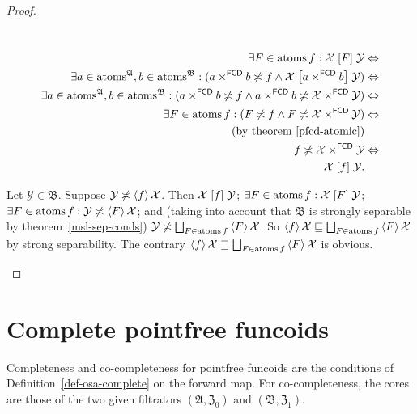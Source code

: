 \begin{proof}
~
\begin{widedisorder}
\item [{\ref{pf-r-at}}] ~
\begin{align*}
\exists F\in\operatorname{atoms} f:\mathcal{X}\mathrel{\left[F\right]}\mathcal{Y} & \Leftrightarrow\\
\exists a\in\operatorname{atoms}^{\mathfrak{A}},b\in\operatorname{atoms}^{\mathfrak{B}}:(a\times^{\mathsf{FCD}}b\not\asymp f\land\mathcal{X}\mathrel{\left[a\times^{\mathsf{FCD}}b\right]}\mathcal{Y}) & \Leftrightarrow\\
\exists a\in\operatorname{atoms}^{\mathfrak{A}},b\in\operatorname{atoms}^{\mathfrak{B}}:(a\times^{\mathsf{FCD}}b\not\asymp f\land a\times^{\mathsf{FCD}}b\not\asymp\mathcal{X}\times^{\mathsf{FCD}}\mathcal{Y}) & \Leftrightarrow\\
\exists F\in\operatorname{atoms} f:(F\not\asymp f\land F\not\asymp\mathcal{X}\times^{\mathsf{FCD}}\mathcal{Y}) & \Leftrightarrow\\
\text{(by theorem~\ref{pfcd-atomic})}\\
f\not\asymp\mathcal{X}\times^{\mathsf{FCD}}\mathcal{Y} & \Leftrightarrow\\
\mathcal{X}\mathrel{\left[f\right]}\mathcal{Y}.
\end{align*}

\item [{\ref{pf-f-at}}] Let $\mathcal{Y}\in\mathfrak{B}$. Suppose
$\mathcal{Y}\not\asymp\left\langle f\right\rangle\mathcal{X}$. Then $\mathcal{X}\mathrel{\left[f\right]}\mathcal{Y}$;
$\exists F\in\operatorname{atoms} f:\mathcal{X}\mathrel{\left[F\right]}\mathcal{Y}$; $\exists F\in\operatorname{atoms} f:\mathcal{Y}\not\asymp\left\langle F\right\rangle\mathcal{X}$;
and (taking into account that $\mathfrak{B}$ is strongly separable by theorem~\ref{msl-sep-conds})
$\mathcal{Y}\nasymp\bigsqcup_{F\in\atoms f}\supfun F\mathcal{X}$.
So $\supfun f\mathcal{X}\sqsubseteq\bigsqcup_{F\in\atoms f}\supfun F\mathcal{X}$ by strong separability.
The contrary $\supfun f\mathcal{X}\sqsupseteq\bigsqcup_{F\in\atoms f}\supfun F\mathcal{X}$
is obvious.
\end{widedisorder}
\end{proof}

\section{Complete pointfree funcoids}
Completeness and co-completeness for pointfree funcoids are the
conditions of Definition~\ref{def-osa-complete} on the forward map.
For co-completeness, the cores are those of the two given filtrators
$(\mathfrak A,\mathfrak Z_0)$ and $(\mathfrak B,\mathfrak Z_1)$.

